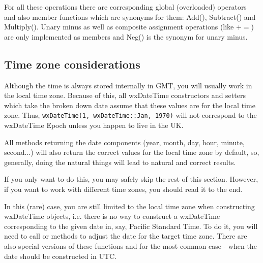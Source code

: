 \begin{twocollist}\itemsep=0pt
\end{twocollist}

For all these operations there are corresponding global (overloaded) operators
and also member functions which are synonyms for them: Add(), Subtract() and
Multiply(). Unary minus as well as composite assignment operations (like $+=$)
are only implemented as members and Neg() is the synonym for unary minus.

\subsection{Time zone considerations}\label{tdatetimezones}

Although the time is always stored internally in GMT, you will usually work in
the local time zone. Because of this, all wxDateTime constructors and setters
which take the broken down date assume that these values are for the local
time zone. Thus, {\tt wxDateTime(1, wxDateTime::Jan, 1970)} will not
correspond to the wxDateTime Epoch unless you happen to live in the UK.

All methods returning the date components (year, month, day, hour, minute,
second...) will also return the correct values for the local time zone by
default, so, generally, doing the natural things will lead to natural and
correct results.

If you only want to do this, you may safely skip the rest of this section.
However, if you want to work with different time zones, you should read it to
the end.

In this (rare) case, you are still limited to the local time zone when
constructing wxDateTime objects, i.e. there is no way to construct a
wxDateTime corresponding to the given date in, say, Pacific Standard Time.
To do it, you will need to call  or 
 methods to adjust the date for
the target time zone. There are also special versions of these functions 
 and  for
the most common case - when the date should be constructed in UTC.

